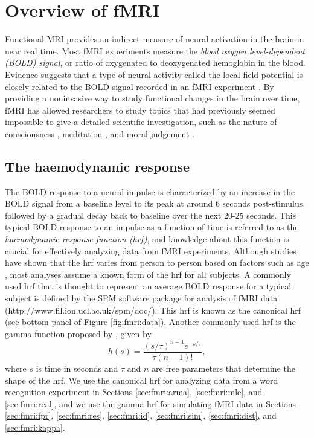 \section{Overview of fMRI \label{sec:fmri:intro}}

Functional MRI provides an indirect measure of neural activation in the brain in near real time. Most fMRI experiments measure the \emph{blood oxygen level-dependent (BOLD) signal}, or ratio of oxygenated to deoxygenated hemoglobin in the blood. Evidence suggests that a type of neural activity called the local field potential is closely related to the BOLD signal recorded in an fMRI experiment \citep{logo:bold:2003,logo:bold:2001}. By providing a noninvasive way to study functional changes in the brain over time, fMRI has allowed researchers to study topics that had previously seemed impossible to give a detailed scientific investigation, such as the nature of consciousness \citep{lloyd:conscious:2002}, meditation \citep{cahn:med:2006}, and moral judgement \citep{greene:moral:2001}.

\subsection{The haemodynamic response \label{sec:fmri:hrf}}

The BOLD response to a neural impulse is characterized by an increase in the BOLD signal from a baseline level to its peak at around 6 seconds post-stimulus, followed by a gradual decay back to baseline over the next 20-25 seconds. This typical BOLD response to an impulse as a function of time is referred to as the \emph{haemodynamic response function (hrf)}, and knowledge about this function is crucial for effectively analyzing data from fMRI experiments. Although studies have shown that the hrf varies from person to person based on factors such as age \citep{rich:hrf:2003}, most analyses assume a known form of the hrf for all subjects. A commonly used hrf that is thought to represent an average BOLD response for a typical subject is defined by the SPM software package for analysis of fMRI data (http://www.fil.ion.ucl.ac.uk/spm/doc/). This hrf is known as the canonical hrf (see bottom panel of Figure \ref{fig:fmri:data}). Another commonly used hrf is the gamma function proposed by \citet{boyn:linear:1996}, given by
\begin{equation}
h(s) = \frac{(s/\tau)^{n-1}e^{-s/\tau}}{\tau(n-1)!}, \label{eqn:hrf}
\end{equation}
where $s$ is time in seconds and $\tau$ and $n$ are free parameters that determine the shape of the hrf. We use the canonical hrf for analyzing data from a word recognition experiment in Sections \ref{sec:fmri:arma}, \ref{sec:fmri:mle}, and \ref{sec:fmri:real}, and we use the gamma hrf for simulating fMRI data in Sections \ref{sec:fmri:fpr}, \ref{sec:fmri:res}, \ref{sec:fmri:id}, \ref{sec:fmri:sim}, \ref{sec:fmri:dist}, and \ref{sec:fmri:kappa}.

